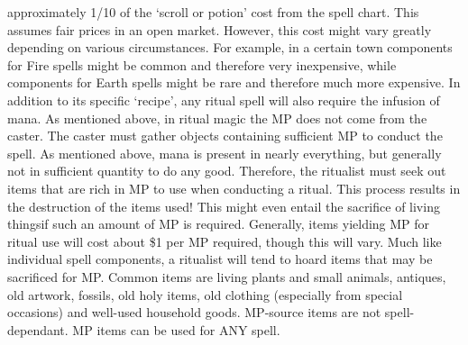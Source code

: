 \documentclass[twoside]{book}
\begin{document}
               approximately 1/10 of the `scroll or potion'
               cost from the spell chart. This assumes fair prices in an
               open market. However, this cost might vary greatly
               depending on various circumstances. For example, in a
               certain town components for Fire spells might be common
               and therefore very inexpensive, while components for Earth
               spells might be rare and therefore much more expensive.
                 In addition to its specific `recipe',
               any ritual spell will also require the infusion of mana.
               As mentioned above, in ritual magic the MP does not come
               from the caster. The caster must gather objects containing
               sufficient MP to conduct the spell. As mentioned above,
               mana is present in nearly everything, but generally not in
               sufficient quantity to do any good. Therefore, the
               ritualist must seek out items that are rich in MP to use
               when conducting a ritual. This process results in the
               destruction of the items used! This might even entail the
               sacrifice of living thingsif such an amount of MP
               is required. Generally, items yielding MP for ritual use
               will cost about \$1 per MP required, though this will vary.
               Much like individual spell components, a ritualist will
               tend to hoard items that may be sacrificed for MP. Common
               items are living plants and small animals, antiques, old
               artwork, fossils, old holy items, old clothing (especially
               from special occasions) and well-used household goods.
               MP-source items are not spell-dependant. MP items can be
               used for ANY spell. 
\end{document}
